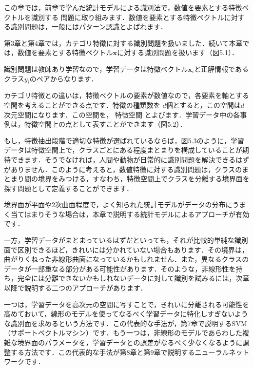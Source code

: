 
この章では，前章で学んだ統計モデルによる識別法で，数値を要素とする特徴ベクトルを識別する
問題に取り組みます．数値を要素とする特徴ベクトルに対する識別問題は，一般にはパターン認識とよばれます．


第3章と第4章では，カテゴリ特徴に対する識別問題を扱いました．続いて本章では，数値を要素とする特徴ベクトル$\bm{x}$に対する識別問題を扱います（図5.1）．


識別問題は教師あり学習なので，学習データは特徴ベクトル$\bm{x}_i$と正解情報であるクラス$y_i$のペアからなります．

カテゴリ特徴との違いは，特徴ベクトルの要素が数値なので，各要素を軸とする空間を考えることができる点です．特徴の種類数を
$d$個とすると，この空間は$d$次元空間になります．この空間を，
特徴空間
とよびます．学習データ中の各事例は，特徴空間上の点として表すことができます（図5.2）．

もし，特徴抽出段階で適切な特徴が選ばれているならば，図5.3のように，学習データは特徴空間上で，クラスごとにある程度まとまりを構成していることが期待できます．そうでなければ，人間や動物が日常的に識別問題を解決できるはずがありません．このように考えると，数値特徴に対する識別問題は，クラスのまとまり間の境界をみつける，すなわち，特徴空間上でクラスを分離する境界面を探す問題として定義することができます．

境界面が平面や2次曲面程度で，よく知られた統計モデルがデータの分布にうまく当てはまりそうな場合は，本章で説明する統計モデルによるアプローチが有効です．

一方，学習データがまとまっているはずだといっても，それが比較的単純な識別面で区別できるほど，きれいには分かれていない場合もあります．その境界は，曲がりくねった非線形曲面になっているかもしれません．また，異なるクラスのデータが一部重なる部分がある可能性があります．そのような，非線形性を持ち，完全には分離できないかもしれないデータに対して識別を試みるには，次章以降で説明する二つのアプローチがあります．

一つは，学習データを高次元の空間に写すことで，きれいに分離される可能性を高めておいて，線形のモデルを使ってなるべく学習データに特化しすぎないような識別面を求めるという方法です．この代表的な手法が，第7章で説明するSVM（サポートベクトルマシン）です．もう一つは，非線形のモデルであらわした複雑な境界面のパラメータを，学習データとの誤差がなるべく少なくなるように調整する方法です．この代表的な手法が第8章と第9章で説明するニューラルネットワークです．

